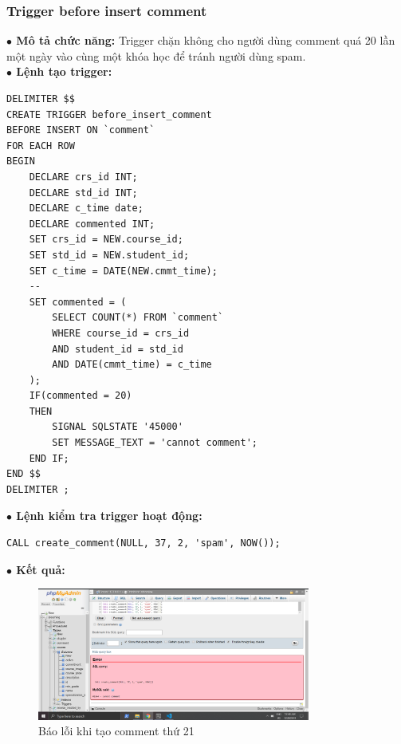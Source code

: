 \documentclass[12pt,a4paper,titlepage]{article}
\begin{document}
\subsubsection{Trigger before insert comment}
\textbf{$\bullet$ Mô tả chức năng:} Trigger chặn không cho người dùng comment quá 20 lần một ngày vào cùng một khóa học để tránh người dùng spam.\\
\textbf{$\bullet$ Lệnh tạo trigger:}
\begin{lstlisting}
DELIMITER $$
CREATE TRIGGER before_insert_comment
BEFORE INSERT ON `comment`
FOR EACH ROW
BEGIN
    DECLARE crs_id INT;
    DECLARE std_id INT;
    DECLARE c_time date;
    DECLARE commented INT;
    SET crs_id = NEW.course_id;
    SET std_id = NEW.student_id;
    SET c_time = DATE(NEW.cmmt_time);
    --
    SET commented = (
        SELECT COUNT(*) FROM `comment`
        WHERE course_id = crs_id
        AND student_id = std_id
        AND DATE(cmmt_time) = c_time
    );
    IF(commented = 20)
    THEN
        SIGNAL SQLSTATE '45000'
		SET MESSAGE_TEXT = 'cannot comment';
    END IF;
END $$
DELIMITER ;
\end{lstlisting}
\textbf{$\bullet$ Lệnh kiểm tra trigger hoạt động:}
\begin{lstlisting}
CALL create_comment(NULL, 37, 2, 'spam', NOW());
\end{lstlisting}
\textbf{$\bullet$ Kết quả:}
\begin{figure}[h!]
	\centering
	\caption{Báo lỗi khi tạo comment thứ 21}
	\includegraphics[width=0.8\textwidth]{images/cmmt2.png}
\end{figure}
\end{document}
